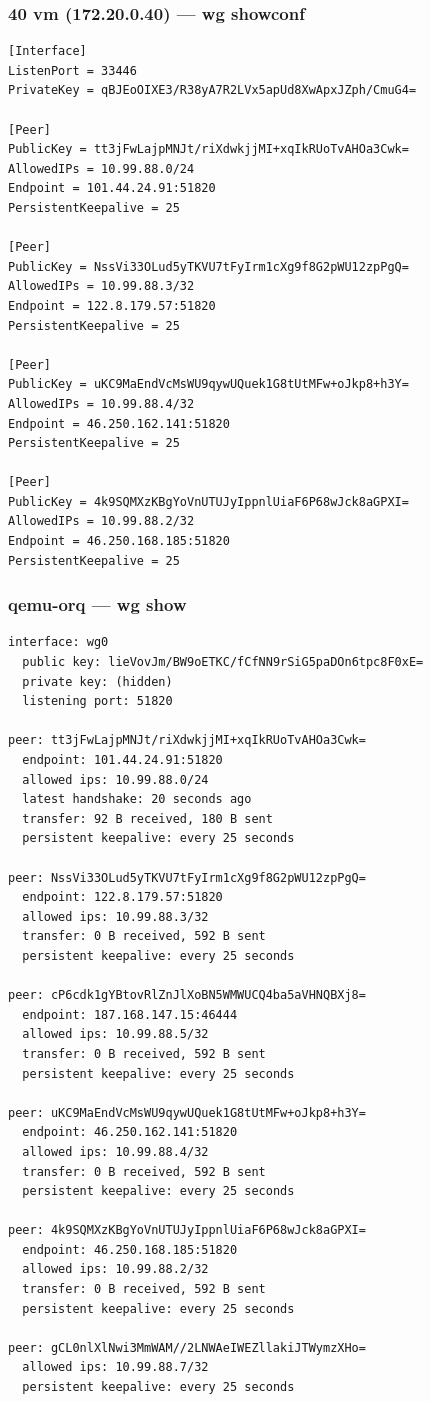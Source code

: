 \documentclass[11pt,a4paper]{article}
\begin{document}
\subsubsection*{40 vm (172.20.0.40) — wg showconf}
\begin{lstlisting}
[Interface]
ListenPort = 33446
PrivateKey = qBJEoOIXE3/R38yA7R2LVx5apUd8XwApxJZph/CmuG4=

[Peer]
PublicKey = tt3jFwLajpMNJt/riXdwkjjMI+xqIkRUoTvAHOa3Cwk=
AllowedIPs = 10.99.88.0/24
Endpoint = 101.44.24.91:51820
PersistentKeepalive = 25

[Peer]
PublicKey = NssVi33OLud5yTKVU7tFyIrm1cXg9f8G2pWU12zpPgQ=
AllowedIPs = 10.99.88.3/32
Endpoint = 122.8.179.57:51820
PersistentKeepalive = 25

[Peer]
PublicKey = uKC9MaEndVcMsWU9qywUQuek1G8tUtMFw+oJkp8+h3Y=
AllowedIPs = 10.99.88.4/32
Endpoint = 46.250.162.141:51820
PersistentKeepalive = 25

[Peer]
PublicKey = 4k9SQMXzKBgYoVnUTUJyIppnlUiaF6P68wJck8aGPXI=
AllowedIPs = 10.99.88.2/32
Endpoint = 46.250.168.185:51820
PersistentKeepalive = 25

\end{lstlisting}

\subsubsection*{qemu-orq — wg show}
\begin{lstlisting}
interface: wg0
  public key: lieVovJm/BW9oETKC/fCfNN9rSiG5paDOn6tpc8F0xE=
  private key: (hidden)
  listening port: 51820

peer: tt3jFwLajpMNJt/riXdwkjjMI+xqIkRUoTvAHOa3Cwk=
  endpoint: 101.44.24.91:51820
  allowed ips: 10.99.88.0/24
  latest handshake: 20 seconds ago
  transfer: 92 B received, 180 B sent
  persistent keepalive: every 25 seconds

peer: NssVi33OLud5yTKVU7tFyIrm1cXg9f8G2pWU12zpPgQ=
  endpoint: 122.8.179.57:51820
  allowed ips: 10.99.88.3/32
  transfer: 0 B received, 592 B sent
  persistent keepalive: every 25 seconds

peer: cP6cdk1gYBtovRlZnJlXoBN5WMWUCQ4ba5aVHNQBXj8=
  endpoint: 187.168.147.15:46444
  allowed ips: 10.99.88.5/32
  transfer: 0 B received, 592 B sent
  persistent keepalive: every 25 seconds

peer: uKC9MaEndVcMsWU9qywUQuek1G8tUtMFw+oJkp8+h3Y=
  endpoint: 46.250.162.141:51820
  allowed ips: 10.99.88.4/32
  transfer: 0 B received, 592 B sent
  persistent keepalive: every 25 seconds

peer: 4k9SQMXzKBgYoVnUTUJyIppnlUiaF6P68wJck8aGPXI=
  endpoint: 46.250.168.185:51820
  allowed ips: 10.99.88.2/32
  transfer: 0 B received, 592 B sent
  persistent keepalive: every 25 seconds

peer: gCL0nlXlNwi3MmWAM//2LNWAeIWEZllakiJTWymzXHo=
  allowed ips: 10.99.88.7/32
  persistent keepalive: every 25 seconds

\end{lstlisting}
\end{document}
